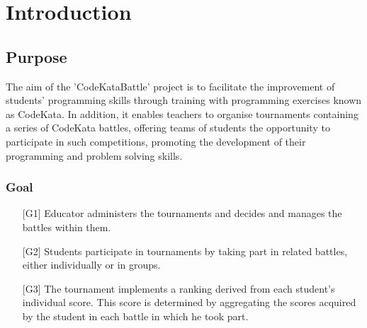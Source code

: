 \section{Introduction}
\vspace{1.5\baselineskip}

\subsection{Purpose}
The aim of the 'CodeKataBattle' project is to facilitate the improvement of students' programming skills through training with programming exercises known as CodeKata. In addition, it enables teachers to organise tournaments containing a series of CodeKata battles, offering teams of students the opportunity to participate in such competitions, promoting the development of their programming and problem solving skills.

\vspace{1\baselineskip}
\subsubsection{Goal}
\begin{itemize}
\setlength{\itemsep}{0pt}
    \setlength{\parskip}{0pt}
    \setlength{\parsep}{0pt}
    \setlength{\partopsep}{0pt}
    \setlength{\topsep}{0pt}
    \item [{[G1]}] Educator administers the tournaments and decides and manages the battles within them.
    \item [{[G2]}] Students participate in tournaments by taking part in related battles, either individually or in groups.
    \item [{[G3]}] The tournament implements a ranking derived from each student's individual score. This score is determined by aggregating the scores acquired by the student in each battle in which he took part.
\end{itemize}

\clearpage

